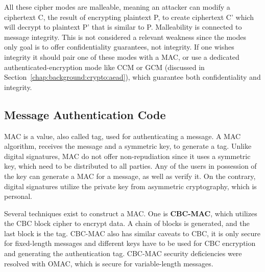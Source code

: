 All these cipher modes are malleable, meaning an attacker can modify a ciphertext C, the result of encrypting plaintext P, to create ciphertext C' which will decrypt to plaintext P' that is similar to P. Malleability is connected to message integrity. This is not considered a relevant weakness since the modes only goal is to offer confidentiality guarantees, not integrity. If one wishes integrity it should pair one of these modes with a \ac{MAC}, or use a dedicated authenticated-encryption mode like \ac{CCM} or \ac{GCM} (discussed in Section~\ref{chap:background:crypto:aead}), which guarantee both confidentiality and integrity.


\subsection{Message Authentication Code}\label{chap:background:crypto:mac}

\ac{MAC} is a value, also called tag, used for authenticating a message.
A \ac{MAC} algorithm, receives the message and a symmetric key, to generate a tag. Unlike digital signatures, \ac{MAC} do not offer non-repudiation since it uses a symmetric key, which need to be distributed to all parties. Any of the users in possession of the key can generate a \ac{MAC} for a message, as well as verify it. On the contrary, digital signatures utilize the private key from asymmetric cryptography, which is personal.

Several techniques exist to construct a \ac{MAC}. One is \textbf{\ac{CBC-MAC}}, which utilizes the \ac{CBC} block cipher to encrypt data. A chain of blocks is generated, and the last block is the tag.
\ac{CBC-MAC} also has similar caveats to \ac{CBC}, it is only secure for fixed-length messages \cite{aesmodes} and different keys have to be used for \ac{CBC} encryption and generating the authentication tag. 
\ac{CBC-MAC} security deficiencies were resolved with \ac{OMAC}, which is secure for variable-length messages.

